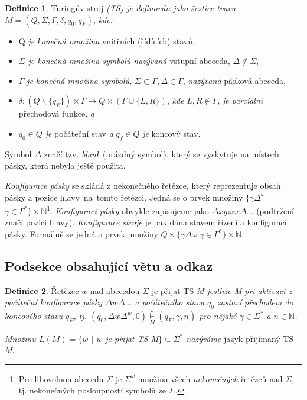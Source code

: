 \documentclass[a4paper, 11pt, twocolumn]{article}
\theoremstyle{definition}
\newtheorem{definition}{Definice}
\begin{document}
\begin{definition}
    \label{first_definition}
    Turingův stroj \emph{(TS) je definován jako šestice tvaru } $ M = (Q, \Sigma, \Gamma, \delta, q_0, q_F) $, \emph{ kde:}
    \begin{itemize}
        \setlength\itemsep{0.05em}
        \item Q \emph{je konečná množina} vnitřních (řídících) stavů,
        \item $\Sigma$ \emph{je konečná množina symbolů nazývaná} vstupní abeceda, $\Delta \notin \Sigma$,
        \item $\Gamma$ \emph{je konečná množina symbolů,} $\Sigma \subset \Gamma, \Delta \in \Gamma$, \emph{nazývaná} pásková abeceda,
        \item $\delta : (Q\backslash \{q_F\} ) \times \Gamma \rightarrow Q \times (\Gamma \cup \{L, R\})$, \emph{kde} $L, R \notin \Gamma$, \emph{je parciální} přechodová funkce, \emph{a}
        \item $q_0 \in Q$ \emph{je} počáteční stav \emph{a} $q_f \in Q$ \emph{je} koncový stav.
    \end{itemize}
    
    Symbol $\Delta$ značí tzv. \emph{blank} (prázdný symbol), který se vyskytuje na místech pásky, která nebyla ještě použita.
    
    \emph{Konfigurace pásky} se skládá z nekonečného ře\-tězce, který reprezentuje obsah pásky a pozice hlavy~na~tomto řetězci. Jedná se o prvek množiny $\{ \gamma \Delta^\omega$ $|$ $\gamma \in \Gamma^* \} \times \mathbb{N}$\footnote{Pro libovolnou abecedu $\Sigma$ je $\Sigma^\omega$ množina všech \emph{nekonečných} \linebreak řetězců nad $\Sigma$, tj. nekonečných posloupností symbolů ze $\Sigma$.}.
    \emph{Konfiguraci pásky} obvykle zapisujeme jako $\Delta x y z z x \Delta\ldots$ (podtržení značí pozici hlavy). \emph{Konfigurace stroje} je pak dána stavem řízení a konfigurací pásky. Formálně se jedná o prvek množiny $Q \times \{\gamma \Delta \omega | \gamma \in \Gamma^*\}\times \mathbb{N}$.
    
\end{definition}

\subsection{Podsekce obsahující větu a odkaz}
\begin{definition}
    \label{second_definition}
    Řetězec $w$ nad abecedou $\Sigma$ je přijat TS \emph{M jestliže M při aktivaci z počáteční konfigurace pásky \linebreak $\underline{\Delta}w\Delta\ldots$ a počátečního stavu $q_0$ zastaví přechodem do koncového stavu $q_F$, tj. $(q_0, \Delta w \Delta^w, 0) \underset{M}{\overset{*}{\vdash}} (q_F, \gamma, n)$ pro nějaké $\gamma \in \Sigma^*$ a $n \in \mathbb{N}$.}
    
    \emph{Množinu $L(M) = \{w $ $|$ $ w $ je přijat TS M$\} \subseteq \Sigma^*$ nazýváme} jazyk přijímaný TS \emph{M}.
\end{definition}
\end{document}
